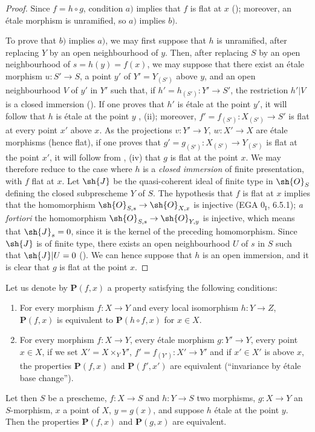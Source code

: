 \begin{proof}
Since $f=h\circ g$, condition $a)$ implies that $f$ is flat at $x$ (); moreover, an \'etale morphism is unramified, so $a)$ implies $b)$.

To prove that $b)$ implies $a)$, we may first suppose that $h$ is unramified, after replacing $Y$ by an open neighbourhood of $y$.
Then, after replacing $S$ by an open neighbourhood of $s=h(y)=f(x)$, we may suppose that there exist an \'etale morphism $u:S'\to S$, a point $y'$ of $Y'=Y_{(S')}$ above $y$, and an open neighbourhood $V$ of $y'$ in $Y'$ such that, if $h'=h_{(S')}:Y'\to S'$, the restriction $h'|V$ is a closed immersion ().
If one proves that $h'$ is \'etale at the point $y'$, it will follow that $h$ is \'etale at the point $y$ , (ii);
moreover, $f'=f_{(S')}:X_{(S')}\to S'$ is flat at every point $x'$ above $x$.
As the projections $v:Y'\to Y$, $w:X'\to X$ are \'etale morphisms (hence flat), if one proves that $g'=g_{(S')}:X_{(S')}\to Y_{(S')}$ is flat at the point $x'$, it will follow from , (iv) that $g$ is flat at the point $x$.
We may therefore reduce to the case where $h$ is a \emph{closed immersion}
of finite presentation, with $f$ flat at $x$.
Let $\sh{J}$ be the quasi-coherent ideal of finite type in $\sh{O}_S$ defining the closed subprescheme $Y$ of $S$.
The hypothesis that $f$ is flat at $x$ implies that the homomorphism $\sh{O}_{S,s}\to\sh{O}_{X,x}$ is injective (EGA $0_{\mathrm{I}}$, 6.5.1);
\emph{a fortiori} the homomorphism $\sh{O}_{S,s}\to\sh{O}_{Y,y}$ is injective, which means that $\sh{J}_s=0$, since it is the kernel of the preceding homomorphism.
Since $\sh{J}$ is of finite type, there exists an open neighbourhood $U$ of $s$ in $S$ such that $\sh{J}|U=0$ ().
We can hence suppose that $h$ is an open immersion, and it is clear that $g$ is flat at the point $x$.
\end{proof}

\begin{proposition}[18.4.10]
\label{IV.18.4.10}
Let us denote by $\mathbf{P}(f,x)$ a property satisfying the following conditions:
\begin{enumerate}
  \item[$1^\circ$] For every morphism $f:X\to Y$ and every local isomorphism $h:Y\to Z$, $\mathbf{P}(f,x)$ is equivalent to $\mathbf{P}(h\circ f,x)$ for $x\in X$.
  \item[$2^\circ$] For every morphism $f:X\to Y$, every \'etale morphism $g:Y'\to Y$, every point $x\in X$, if we set $X'=X\times_Y Y'$, $f'=f_{(Y')}:X'\to Y'$ and if $x'\in X'$ is above $x$, the properties $\mathbf{P}(f,x)$ and $\mathbf{P}(f',x')$ are equivalent (``invariance by \'etale base change'').
\end{enumerate}
Let then $S$ be a prescheme, $f:X\to S$ and $h:Y\to S$ two morphisms, $g:X\to Y$ an $S$-morphism, $x$ a point of $X$, $y=g(x)$, and suppose $h$ \'etale at the point $y$.
Then the properties $\mathbf{P}(f,x)$ and $\mathbf{P}(g,x)$ are equivalent.
\end{proposition}

